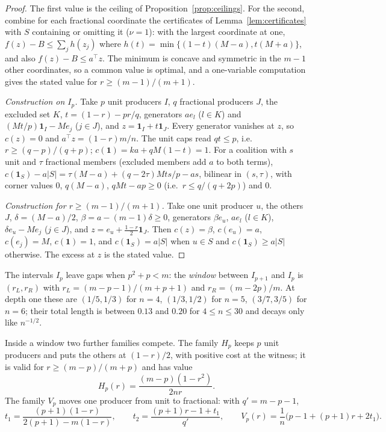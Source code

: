 \documentclass[11pt,a4paper]{article}
\theoremstyle{remark}
\newcommand{\one}{\mathbf 1}
\begin{document}
\begin{proof}
The first value is the ceiling of Proposition~\ref{prop:ceilings}. For the
second, combine for each fractional coordinate the certificates of
Lemma~\ref{lem:certificates} with $S$ containing or omitting it ($\nu=1$):
with the largest coordinate at one, $f(z)-B\le\sum_j h(z_j)$ where
$h(t)=\min\{(1-t)(M-a),t(M+a)\}$, and also $f(z)-B\le a^\top z$. The minimum is
concave and symmetric in the $m-1$ other coordinates, so a common value is
optimal, and a one-variable computation gives the stated value for
$r\ge(m-1)/(m+1)$.

\emph{Construction on $I_p$.} Take $p$ unit producers $I$, $q$ fractional
producers $J$, the excluded set $K$, $t=(1-r)-pr/q$, generators $a e_l$
($l\in K$) and $(Mt/p)\one_I-Me_j$ ($j\in J$), and $z=\one_I+t\one_J$. Every
generator vanishes at $z$, so $c(z)=0$ and $a^\top z=(1-r)m/n$. The unit caps
read $qt\le p$, i.e.\ $r\ge(q-p)/(q+p)$; $c(\one)=ka+qM(1-t)=1$. For a
coalition with $s$ unit and $\tau$ fractional members (excluded members add
$a$ to both terms),
$c(\one_S)-a|S|=\tau(M-a)+(q-2\tau)Mts/p-as$, bilinear in $(s,\tau)$, with
corner values $0$, $q(M-a)$, $qMt-ap\ge0$ (i.e.\ $r\le q/(q+2p)$) and $0$.

\emph{Construction for $r\ge(m-1)/(m+1)$.} Take one unit producer $u$, the
others $J$, $\delta=(M-a)/2$, $\beta=a-(m-1)\delta\ge0$, generators $\beta e_u$,
$ae_l$ ($l\in K$), $\delta e_u-Me_j$ ($j\in J$), and
$z=e_u+\frac{1-r}2\one_J$. Then $c(z)=\beta$, $c(e_u)=a$, $c(e_j)=M$,
$c(\one)=1$, and $c(\one_S)=a|S|$ when $u\in S$ and $c(\one_S)\ge a|S|$
otherwise. The excess at $z$ is the stated value.
\end{proof}

The intervals $I_p$ leave gaps when $p^2+p<m$: the \emph{window} between
$I_{p+1}$ and $I_p$ is $(r_L,r_R)$ with $r_L=(m-p-1)/(m+p+1)$ and
$r_R=(m-2p)/m$. At depth one these are $(1/5,1/3)$ for $n=4$, $(1/3,1/2)$ for
$n=5$, $(3/7,3/5)$ for $n=6$; their total length is between $0.13$ and $0.20$
for $4\le n\le30$ and decays only like $n^{-1/2}$.

Inside a window two further families compete. The family $H_p$ keeps $p$ unit
producers and puts the others at $(1-r)/2$, with positive cost at the witness;
it is valid for $r\ge(m-p)/(m+p)$ and has value
\[
H_p(r)=\frac{(m-p)(1-r^2)}{2nr}.
\]
The family $V_p$ moves one producer from unit to fractional: with
$q'=m-p-1$,
\[
t_1=\frac{(p+1)(1-r)}{2(p+1)-m(1-r)},\qquad
t_2=\frac{(p+1)r-1+t_1}{q'},\qquad
V_p(r)=\frac1n\bigl(p-1+(p+1)r+2t_1\bigr).
\]
\end{document}
